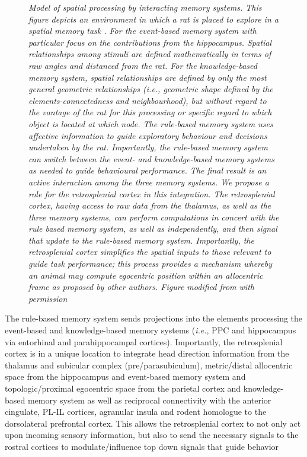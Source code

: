 \documentclass[doc, longtable]{apa6}
\begin{document}
\begin{figure}
\captionsetup{labelformat=adja-page}
\ContinuedFloat
\caption{\textit{Model of spatial processing by interacting memory systems. This figure depicts an environment in which a rat is placed to explore in a spatial memory task \parencite{Goodrich-Hunsaker2005a, goodrich2008interactions}. For the event-based memory system with particular focus on the contributions from the hippocampus. Spatial relationships among stimuli are defined mathematically in terms of raw angles and distanced from the rat. For the knowledge-based memory system, spatial relationships are defined by only the most general geometric relationships (i.e., geometric shape defined by the elements-connectedness and neighbourhood), but without regard to the vantage of the rat for this processing or specific regard to which object is located at which node. The rule-based memory system uses affective information to guide exploratory behaviour and decisions undertaken by the rat. Importantly, the rule-based memory system can switch between the event- and knowledge-based memory systems as needed to guide behavioural performance. The final result is an active interaction among the three memory systems. We propose a role for the retrosplenial cortex in this integration. The retrosplenial cortex, having access to raw data from the thalamus, as well as the three memory systems, can perform computations in concert with the rule based memory system, as well as independently, and then signal that update to the rule-based memory system. Importantly, the retrosplenial cortex simplifies the spatial inputs to those relevant to guide task performance; this process provides a mechanism whereby an animal may compute egocentric position within an allocentric frame as proposed by other authors. Figure modified from \textcite{Hunsaker2013c} with permission }} \label{fig4}
\end{figure}

The rule-based memory system sends projections into the elements processing the event-based and knowledge-based memory systems (\textit{i.e.}, PPC and hippocampus via entorhinal and parahippocampal cortices). Importantly, the retrosplenial cortex is in a unique location to integrate head direction information from the thalamus and subicular complex (pre/parasubiculum), metric/distal allocentric space from the hippocampus and event-based memory system and topologic/proximal egocentric space from the parietal cortex and knowledge-based memory system as well as reciprocal connectivity with the anterior cingulate, PL-IL cortices, agranular insula and rodent homologue to the dorsolateral prefrontal cortex. This allows the retrosplenial cortex to not only act upon incoming sensory information, but also to send the necessary signals to the rostral cortices to modulate/influence top down signals that guide behavior
\end{document}

